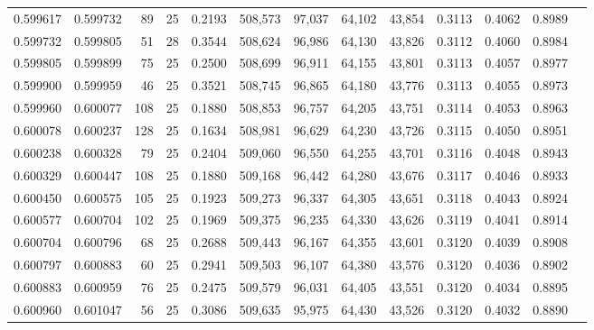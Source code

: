 \begin{tabular}{rrrrrrrrrrrrr}
0.599617 & 0.599732 &    89 &  25 &                                     0.2193 & 508,573 &  97,037 &  64,102 &  43,854 & 0.3113 & 0.4062 & 0.8989 \\
0.599732 & 0.599805 &    51 &  28 &                                     0.3544 & 508,624 &  96,986 &  64,130 &  43,826 & 0.3112 & 0.4060 & 0.8984 \\
0.599805 & 0.599899 &    75 &  25 &                                     0.2500 & 508,699 &  96,911 &  64,155 &  43,801 & 0.3113 & 0.4057 & 0.8977 \\
0.599900 & 0.599959 &    46 &  25 &                                     0.3521 & 508,745 &  96,865 &  64,180 &  43,776 & 0.3113 & 0.4055 & 0.8973 \\
0.599960 & 0.600077 &   108 &  25 &                                     0.1880 & 508,853 &  96,757 &  64,205 &  43,751 & 0.3114 & 0.4053 & 0.8963 \\
0.600078 & 0.600237 &   128 &  25 &                                     0.1634 & 508,981 &  96,629 &  64,230 &  43,726 & 0.3115 & 0.4050 & 0.8951 \\
0.600238 & 0.600328 &    79 &  25 &                                     0.2404 & 509,060 &  96,550 &  64,255 &  43,701 & 0.3116 & 0.4048 & 0.8943 \\
0.600329 & 0.600447 &   108 &  25 &                                     0.1880 & 509,168 &  96,442 &  64,280 &  43,676 & 0.3117 & 0.4046 & 0.8933 \\
0.600450 & 0.600575 &   105 &  25 &                                     0.1923 & 509,273 &  96,337 &  64,305 &  43,651 & 0.3118 & 0.4043 & 0.8924 \\
0.600577 & 0.600704 &   102 &  25 &                                     0.1969 & 509,375 &  96,235 &  64,330 &  43,626 & 0.3119 & 0.4041 & 0.8914 \\
0.600704 & 0.600796 &    68 &  25 &                                     0.2688 & 509,443 &  96,167 &  64,355 &  43,601 & 0.3120 & 0.4039 & 0.8908 \\
0.600797 & 0.600883 &    60 &  25 &                                     0.2941 & 509,503 &  96,107 &  64,380 &  43,576 & 0.3120 & 0.4036 & 0.8902 \\
0.600883 & 0.600959 &    76 &  25 &                                     0.2475 & 509,579 &  96,031 &  64,405 &  43,551 & 0.3120 & 0.4034 & 0.8895 \\
0.600960 & 0.601047 &    56 &  25 &                                     0.3086 & 509,635 &  95,975 &  64,430 &  43,526 & 0.3120 & 0.4032 & 0.8890 \\

\end{tabular}
